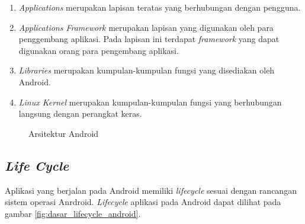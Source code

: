 \begin{enumerate}
\item \textit{Applications} merupakan lapisan teratas yang berhubungan dengan pengguna.
\item \textit{Applications Framework} merupakan lapisan yang digunakan oleh para penggembang aplikasi. Pada lapisan ini terdapat \textit{framework} yang dapat digunakan orang para pengembang aplikasi. %
\item \textit{Libraries} merupakan kumpulan-kumpulan fungsi yang disediakan oleh Android.
\item \textit{Linux Kernel} merupakan kumpulan-kumpulan fungsi yang berhubungan langsung dengan perangkat keras.
\end{enumerate}

\begin{figure}
\centering
{}
\caption[Arsitektur Android]{Arsitektur Android} 
\label{fig:arsitektur_android}
\end{figure}

\subsection{\textit{Life Cycle}}
\label{subsec:lifecycle}

Aplikasi yang berjalan pada Android memiliki \textit{lifecycle} sesuai dengan rancangan sistem operasi Anrdroid. \textit{Lifecycle} aplikasi pada Android dapat dilihat pada gambar \ref{fig:dasar_lifecycle_android}.

